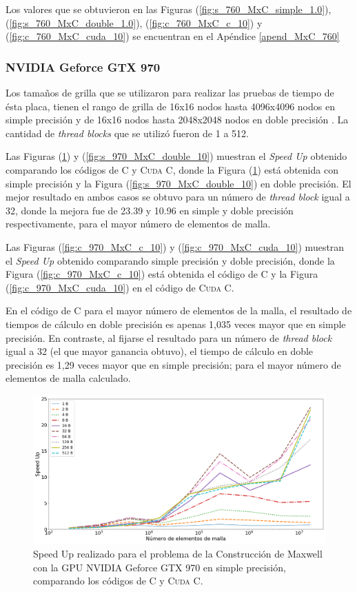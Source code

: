 Los valores que se obtuvieron en las Figuras (\ref{fig:s_760_MxC_simple_1.0}), (\ref{fig:s_760_MxC_double_1.0}), (\ref{fig:c_760_MxC_c_10}) y (\ref{fig:c_760_MxC_cuda_10}) se encuentran en el Apéndice \ref{apend_MxC_760}

\subsubsection{NVIDIA Geforce GTX 970}

Los tamaños de grilla que se utilizaron para realizar las pruebas de tiempo de ésta placa, tienen el rango de grilla de 16x16 nodos hasta 4096x4096 nodos en simple precisión y de 16x16 nodos hasta 2048x2048 nodos en doble precisión . La cantidad de \textit{thread blocks} que se utilizó fueron de 1 a 512.

Las Figuras (\ref{fig:s_970_MxC_simple_10}) y (\ref{fig:s_970_MxC_double_10}) muestran el \textit{Speed Up} obtenido comparando los códigos de \textsc{C} y \textsc{Cuda C}, donde la Figura (\ref{fig:s_970_MxC_simple_10}) está obtenida con simple precisión y la Figura (\ref{fig:s_970_MxC_double_10}) en doble precisión. El mejor resultado en ambos casos se obtuvo para un número de \textit{thread block} igual a 32, donde la mejora fue de 23.39 y 10.96 en simple y doble precisión respectivamente, para el mayor número de elementos de malla.

Las Figuras (\ref{fig:c_970_MxC_c_10}) y (\ref{fig:c_970_MxC_cuda_10}) muestran el \textit{Speed Up} obtenido comparando simple precisión y doble precisión, donde la Figura (\ref{fig:c_970_MxC_c_10}) está obtenida el código de \textsc{C} y la Figura (\ref{fig:c_970_MxC_cuda_10}) en el código de \textsc{Cuda C}.

En el código de \textsc{C} para el mayor número de elementos de la malla, el resultado de tiempos de cálculo en doble precisión es apenas 1,035 veces mayor que en  simple precisión. En contraste, al fijarse el resultado para un número de \textit{thread block} igual a 32 (el que mayor ganancia obtuvo), el tiempo de cálculo en doble precisión es 1,29 veces mayor que en simple precisión; para el mayor número de elementos de malla calculado.

\begin{figure}[htbp]
	\centering
	\includegraphics[width=\textwidth]{figs/cap4/s_970_MxC_simple_10}
	\caption{Speed Up realizado para el problema de la Construcción de Maxwell con la GPU NVIDIA Geforce GTX 970 en simple precisión, comparando los códigos de \textsc{C} y \textsc{Cuda C}.} 
	\label{fig:s_970_MxC_simple_10}	
\end{figure}

